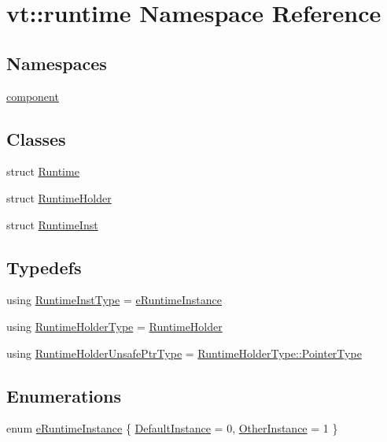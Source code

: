 \hypertarget{namespacevt_1_1runtime}{}\section{vt\+:\+:runtime Namespace Reference}
\label{namespacevt_1_1runtime}
\subsection*{Namespaces}
\begin{DoxyCompactItemize}
\item 
 \hyperlink{namespacevt_1_1runtime_1_1component}{component}
\end{DoxyCompactItemize}
\subsection*{Classes}
\begin{DoxyCompactItemize}
\item 
struct \hyperlink{structvt_1_1runtime_1_1_runtime}{Runtime}
\item 
struct \hyperlink{structvt_1_1runtime_1_1_runtime_holder}{Runtime\+Holder}
\item 
struct \hyperlink{structvt_1_1runtime_1_1_runtime_inst}{Runtime\+Inst}
\end{DoxyCompactItemize}
\subsection*{Typedefs}
\begin{DoxyCompactItemize}
\item 
using \hyperlink{namespacevt_1_1runtime_a012376d47cd009c2e6305f17de9fcfe9}{Runtime\+Inst\+Type} = \hyperlink{namespacevt_1_1runtime_afca910c1b38b3975f7c1da8001a77d58}{e\+Runtime\+Instance}
\item 
using \hyperlink{namespacevt_1_1runtime_ab09d044cce417fbcdb7e1e29b7aabbc3}{Runtime\+Holder\+Type} = \hyperlink{structvt_1_1runtime_1_1_runtime_holder}{Runtime\+Holder}
\item 
using \hyperlink{namespacevt_1_1runtime_a69931905b04961a874e4a70a43083a83}{Runtime\+Holder\+Unsafe\+Ptr\+Type} = \hyperlink{structvt_1_1runtime_1_1_runtime_holder_a9740e8aa7487fcf38b67a7e160d7b046}{Runtime\+Holder\+Type\+::\+Pointer\+Type}
\end{DoxyCompactItemize}
\subsection*{Enumerations}
\begin{DoxyCompactItemize}
\item 
enum \hyperlink{namespacevt_1_1runtime_afca910c1b38b3975f7c1da8001a77d58}{e\+Runtime\+Instance} \{ \hyperlink{namespacevt_1_1runtime_afca910c1b38b3975f7c1da8001a77d58af4b803eff3cdc140ed473828f9c89101}{Default\+Instance} = 0, 
\hyperlink{namespacevt_1_1runtime_afca910c1b38b3975f7c1da8001a77d58af541bede5bc84a16357c26d30a508ff4}{Other\+Instance} = 1
 \}
\end{DoxyCompactItemize}
